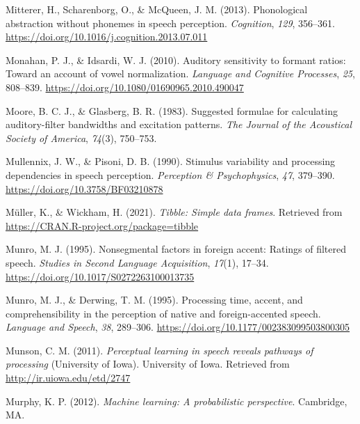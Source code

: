 \documentclass[
  11pt,
  english,
  man,floatsintext]{apa6}
\newlength{\cslhangindent}
\newlength{\cslentryspacingunit} %
\newenvironment{CSLReferences}[2] %
 {%
  \setlength{\parindent}{0pt}
  \ifodd #1
  \let\oldpar\par
  \def\par{\hangindent=\cslhangindent\oldpar}
  \fi
  \setlength{\parskip}{#2\cslentryspacingunit}
 }%
 {}
\begin{document}
\begin{CSLReferences}{1}{0}
\leavevmode{}%
Mitterer, H., Scharenborg, O., \& McQueen, J. M. (2013). Phonological abstraction without phonemes in speech perception. \emph{Cognition}, \emph{129}, 356--361. \url{https://doi.org/10.1016/j.cognition.2013.07.011}

\leavevmode{}%
Monahan, P. J., \& Idsardi, W. J. (2010). Auditory sensitivity to formant ratios: Toward an account of vowel normalization. \emph{Language and Cognitive Processes}, \emph{25}, 808--839. \url{https://doi.org/10.1080/01690965.2010.490047}

\leavevmode{}%
Moore, B. C. J., \& Glasberg, B. R. (1983). Suggested formulae for calculating auditory-filter bandwidths and excitation patterns. \emph{The Journal of the Acoustical Society of America}, \emph{74}(3), 750--753.

\leavevmode{}%
Mullennix, J. W., \& Pisoni, D. B. (1990). Stimulus variability and processing dependencies in speech perception. \emph{Perception \& Psychophysics}, \emph{47}, 379--390. \url{https://doi.org/10.3758/BF03210878}

\leavevmode{}%
Müller, K., \& Wickham, H. (2021). \emph{Tibble: Simple data frames}. Retrieved from \url{https://CRAN.R-project.org/package=tibble}

\leavevmode{}%
Munro, M. J. (1995). Nonsegmental factors in foreign accent: Ratings of filtered speech. \emph{Studies in Second Language Acquisition}, \emph{17}(1), 17--34. \url{https://doi.org/10.1017/S0272263100013735}

\leavevmode{}%
Munro, M. J., \& Derwing, T. M. (1995). Processing time, accent, and comprehensibility in the perception of native and foreign-accented speech. \emph{Language and Speech}, \emph{38}, 289--306. \url{https://doi.org/10.1177/002383099503800305}

\leavevmode{}%
Munson, C. M. (2011). \emph{Perceptual learning in speech reveals pathways of processing} (University of Iowa). University of Iowa. Retrieved from \url{http://ir.uiowa.edu/etd/2747}

\leavevmode{}%
Murphy, K. P. (2012). \emph{Machine learning: A probabilistic perspective}. Cambridge, MA.


\end{CSLReferences}
\end{document}
